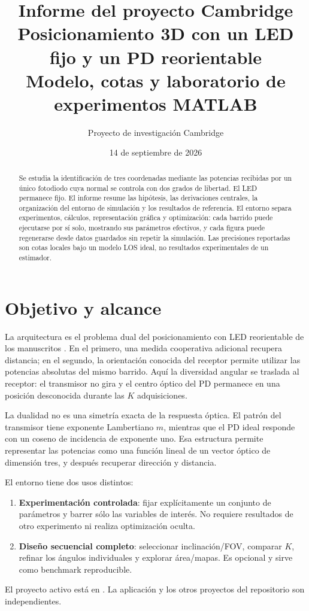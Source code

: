 \documentclass[11pt,a4paper]{article}
\title{Informe del proyecto Cambridge\\Posicionamiento 3D con un LED fijo y un PD reorientable\\\large Modelo, cotas y laboratorio de experimentos MATLAB}
\author{Proyecto de investigación Cambridge}
\date{14 de septiembre de 2026}
\begin{document}
\maketitle
\begin{abstract}
Se estudia la identificación de tres coordenadas mediante las potencias recibidas por un único fotodiodo cuya normal se controla con dos grados de libertad. El LED permanece fijo. El informe resume las hipótesis, las derivaciones centrales, la organización del entorno de simulación y los resultados de referencia. El entorno separa experimentos, cálculos, representación gráfica y optimización: cada barrido puede ejecutarse por sí solo, mostrando sus parámetros efectivos, y cada figura puede regenerarse desde datos guardados sin repetir la simulación. Las precisiones reportadas son cotas locales bajo un modelo LOS ideal, no resultados experimentales de un estimador.
\end{abstract}
\tableofcontents
\clearpage

\section{Objetivo y alcance}
La arquitectura es el problema dual del posicionamiento con LED reorientable de los manuscritos \cite{tcom,broadcast}. En el primero, una medida cooperativa adicional recupera distancia; en el segundo, la orientación conocida del receptor permite utilizar las potencias absolutas del mismo barrido. Aquí la diversidad angular se traslada al receptor: el transmisor no gira y el centro óptico del PD permanece en una posición desconocida durante las $K$ adquisiciones.

La dualidad no es una simetría exacta de la respuesta óptica. El patrón del transmisor tiene exponente Lambertiano $m$, mientras que el PD ideal responde con un coseno de incidencia de exponente uno. Esa estructura permite representar las potencias como una función lineal de un vector óptico de dimensión tres, y después recuperar dirección y distancia.

El entorno tiene dos usos distintos:
\begin{enumerate}
\item \textbf{Experimentación controlada}: fijar explícitamente un conjunto de parámetros y barrer sólo las variables de interés. No requiere resultados de otro experimento ni realiza optimización oculta.
\item \textbf{Diseño secuencial completo}: seleccionar inclinación/FOV, comparar $K$, refinar los ángulos individuales y explorar área/mapas. Es opcional y sirve como benchmark reproducible.
\end{enumerate}
El proyecto activo está en . La aplicación  y los otros proyectos del repositorio son independientes.
\end{document}
